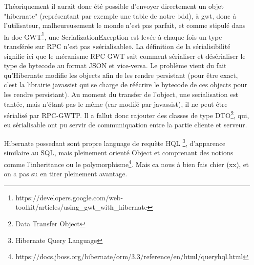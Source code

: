 Théoriquement il aurait donc été possible d'envoyer directement un objet "hibernate" (représentant par exemple une table de notre bdd), à gwt, donc à l'utilisateur, malheureusement le monde n'est pas parfait, et comme stipulé dans la doc GWT\footnote{https://developers.google.com/web-toolkit/articles/using\_gwt\_with\_hibernate},
une SerializationException est levée à chaque fois un type transférée sur RPC n'est pas «sérialisable». La définition de la sérialisibilité signifie ici que le mécanisme RPC GWT sait comment sérialiser et désérialiser le type de bytecode au format JSON et vice-versa.
Le problème vient du fait qu'Hibernate modifie les objects afin de les rendre persistant (pour être exact, c'est la librairie javassist qui se charge de réécrire le bytecode de ces objects pour les rendre persistant). Au moment du transfer de l'object, une serialisation est tantée, mais n'étant pas le même (car modifé par javassist), il ne peut être sérialisé par RPC-GWTP.
Il a fallut donc rajouter des classes de type DTO\footnote{Data Transfer Object}, qui, eu sérialisable ont pu servir de communiquation entre la partie cliente et serveur.

Hibernate possedant sont propre language de requète HQL \footnote{Hibernate Query Language}, d'apparence similaire au SQL, mais pleinement orienté Object et comprenant des notions comme l'inheritance ou le polymorphisme\footnote{https://docs.jboss.org/hibernate/orm/3.3/reference/en/html/queryhql.html}.  Mais ca nous à bien fais chier (xx), et on a pas su en tirer pleinement avantage.



